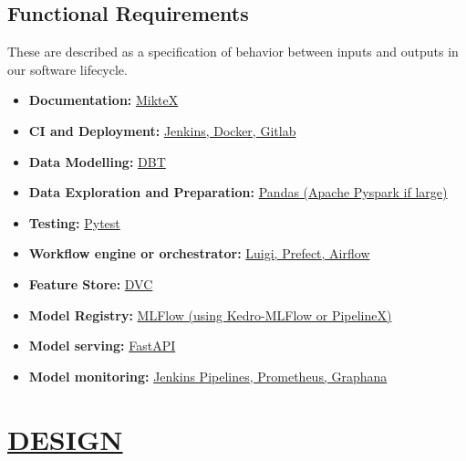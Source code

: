 \documentclass[12pt,oneside,a4paper]{report}
\begin{document}
\section{Functional Requirements}
These are described as a specification of behavior between inputs and outputs in our software lifecycle.
\begin{itemize}
\item 	 \textbf{Documentation:} \underline{MikteX}
\item    \textbf{CI and Deployment:} \underline{Jenkins, Docker, Gitlab}
\item    \textbf{Data Modelling:} \underline{DBT}
\item    \textbf{Data Exploration and Preparation:} \underline{Pandas (Apache Pyspark if large)}
\item    \textbf{Testing:} \underline{Pytest}
\item    \textbf{Workflow engine or orchestrator:} \underline{Luigi, Prefect, Airflow}
\item 	\textbf{Feature Store:} \underline{DVC}
\item    \textbf{Model Registry:} \underline{MLFlow (using Kedro-MLFlow or PipelineX)}
\item    \textbf{Model serving:} \underline{FastAPI}
\item    \textbf{Model monitoring:} \underline{Jenkins Pipelines, Prometheus, Graphana}
\end{itemize}


\chapter{\underline{DESIGN}}
\end{document}
